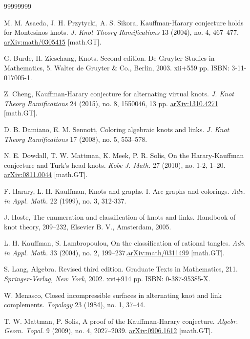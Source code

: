 \documentclass[11pt]{amsart}
\begin{document}
\begin{thebibliography}{99999999}

M. M. Asaeda, J. H. Przytycki, A. S. Sikora,
Kauffman-Harary conjecture holds for Montesinos knots. 
{\it J. Knot Theory Ramifications} 13 (2004), no. 4, 467–477. \href{https://arxiv.org/abs/math/0305415}{arXiv:math/0305415} [math.GT].

 G. Burde, H. Zieschang, Knots. Second edition. De Gruyter Studies in Mathematics, 5. Walter de Gruyter \& Co., Berlin, 2003. xii+559 pp. ISBN: 3-11-017005-1.

 Z. Cheng, Kauffman-Harary conjecture for alternating virtual knots.
{\it J. Knot Theory Ramifications} 24 (2015), no. 8, 1550046, 13 pp. \href{https://arxiv.org/abs/1310.4271}{arXiv:1310.4271} [math.GT].

 D. B. Damiano, E. M. Sennott, Coloring algebraic knots and links. {\it J. Knot Theory Ramifications} 17 (2008), no. 5, 553–578.

N. E. Dowdall, T. W. Mattman, K. Meek, P. R. Solis, On the Harary-Kauffman conjecture and Turk's head knots. {\it Kobe J. Math.} 27 (2010), no. 1-2, 1–20. \href{https://arxiv.org/abs/0811.0044}{arXiv:0811.0044} [math.GT].

F. Harary, L. H. Kauffman, Knots and graphs. I. Arc graphs and colorings. {\it Adv. in Appl. Math.} 22 (1999), no. 3, 312-337.

 J. Hoste, The enumeration and classification of knots and links. Handbook of knot theory, 209–232, Elsevier B. V., Amsterdam, 2005.

L. H. Kauffman, S. Lambropoulou, On the classification of rational tangles.
{\it Adv. in Appl. Math.} 33 (2004), no. 2, 199–237.\href{https://arxiv.org/abs/math/0311499}{arXiv:math/0311499} [math.GT].

S. Lang, Algebra.
Revised third edition. Graduate Texts in Mathematics, 211. {\it Springer-Verlag, New York}, 2002. xvi+914 pp. ISBN: 0-387-95385-X. 

 W. Menasco, Closed incompressible surfaces in alternating knot and link complements. {\it Topology} 23 (1984), no. 1, 37–44.

T. W. Mattman, P. Solis, A proof of the Kauffman-Harary conjecture. {\it Algebr. Geom. Topol.} 9 (2009), no. 4, 2027–2039. \href{https://arxiv.org/abs/0906.1612}{arXiv:0906.1612} [math.GT].



\end{thebibliography}
\end{document}
